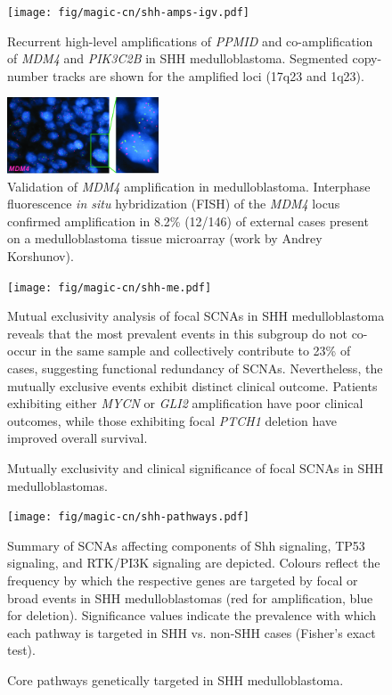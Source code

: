 \documentclass[11pt,letterpaper]{article}
\theoremstyle{definition}
\begin{document}
\begin{figure}
	\centering
	\texttt{[image: fig/magic-cn/shh-amps-igv.pdf]}
	\caption{Recurrent high-level amplifications of \emph{PPMID} and co-amplification of \emph{MDM4} and \emph{PIK3C2B} in SHH medulloblastoma.
	Segmented copy-number tracks are shown for the amplified loci (17q23 and 1q23).}
	\label{fig:shh-amps-igv}
\end{figure}

\begin{figure}
	\centering
	\includegraphics[width=0.4\textwidth]{fig/magic-cn/mdm4-fish.jpg}
	\caption{Validation of \emph{MDM4} amplification in medulloblastoma.
	Interphase fluorescence \emph{in situ} hybridization (FISH) of the \emph{MDM4} locus confirmed amplification in 8.2\% (12/146) of external cases present on a medulloblastoma tissue microarray (work by Andrey Korshunov).}
	\label{fig:mdm4-fish}
\end{figure}

\clearpage

\begin{figure}[h]
	\begin{center}
		\texttt{[image: fig/magic-cn/shh-me.pdf]}
	\end{center}
	\caption{Mutually exclusivity and clinical significance of focal SCNAs in SHH medulloblastomas.}
	Mutual exclusivity analysis of focal SCNAs in SHH medulloblastoma reveals that the most prevalent events in this subgroup do not co-occur in the same sample and collectively contribute to 23\% of cases, suggesting functional redundancy of SCNAs. Nevertheless, the mutually exclusive events exhibit distinct clinical outcome. Patients exhibiting either \emph{MYCN} or \emph{GLI2} amplification have poor clinical outcomes, while those exhibiting focal \emph{PTCH1} deletion have improved overall survival.
	\label{fig:shh-me}
\end{figure}

\begin{figure}[h]
	\begin{center}
		\texttt{[image: fig/magic-cn/shh-pathways.pdf]}
	\end{center}
	\caption{Core pathways genetically targeted in SHH medulloblastoma.}
	Summary of SCNAs affecting components of Shh signaling, TP53 signaling, and RTK/PI3K signaling are depicted. Colours reflect the frequency by which the respective genes are targeted by focal or broad events in SHH medulloblastomas (red for amplification, blue for deletion). Significance values indicate the prevalence with which each pathway is targeted in SHH vs. non-SHH cases (Fisher's exact test).
	\label{fig:shh-pathways}
\end{figure}
\end{document}
